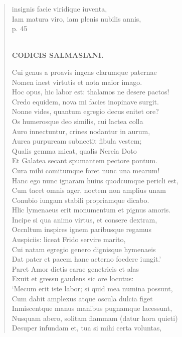 \documentclass[11pt, a4paper]{report}
\begin{document}
\begin{verse}
insignis facie viridique iuventa, \\ Iam matura viro, iam plenis nubilis annis, \\ p. 45 \\ 
        ﻿\pagebreak 
    \begin{center} \textbf{CODICIS SALMASIANI.} \end{center} \marginpar{[81]} Cui genus a proavis ingens clarumque paternae \\ Nomen inest virtutis et nota maior imago. \\ Hoc opus, hic labor est: thalamos ne desere pactos! \\ Credo equidem, nova mi facies inopinave surgit. \\ Nonne vides, quantum egregio decus enitet ore? \\ Os humerosque deo similis, cui lactea colla \\ Auro innectuntur, crines nodantur in aurum, \\ Aurea purpuream subnectit fibula vestem; \\ Qualis gemma micat, qualis Nereia Doto \\ Et Galatea secant spumantem pectore pontum. \\ Cura mihi comitumque foret nunc una mearum! \\ Hanc ego nunc ignaram huius quodcumque pericli est, \\ Cum tacet omnis ager, noctem non amplius unam \\ Conubio iungam stabili propriamque dicabo. \\ Hlic lymenaeus erit monumentum et pignus amoris. \\ Incipe si qua animo virtus, et consere dextram, \\ Occnltum inspires ignem paribusque regamus \\ Auspiciis: liceat Frido servire marito, \\ Cui natam egregio genero dignisque hymenaeis \\ Dat pater et pacem hanc aeterno foedere iungit.’ \\ Paret Amor dictis carae genetricis et alas \\ Exuit et gressu gaudens sic ore locutus: \\ ‘Mecum erit iste labor; si quid mea numina possunt, \\ Cum dabit amplexus atque oscula dulcia figet \\ Inmiscentque manus manibus pugnamque lacessunt, \\ Nusquam abero, solitam flammam (datur hora quieti) \\ Desuper infundam et, tua si mihi certa voluntas, \\ 

\end{verse}
\end{document}
